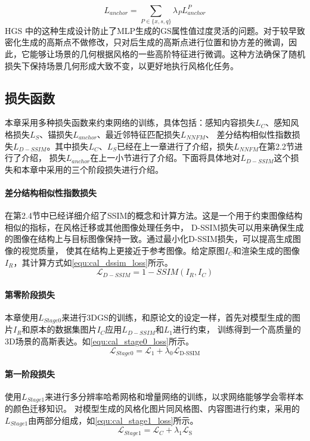 \begin{equation}
    \label{equ:cal_anchor_L}
    L_{anchor}=\sum_{P\in\{x,s,q\}}\lambda_PL_{anchor}^P
\end{equation}
HGS 中的这种生成设计防止了MLP生成的GS属性值过度灵活的问题。对于较早致密化生成的高斯点不做修改，只对后生成的高斯点进行位置和协方差的微调，因此，它能够让场景的几何根据风格的一些高阶特征进行微调。这种方法确保了随机损失下保持场景几何形成大致不变，以更好地执行风格化任务。
\subsection{损失函数}
本章采用多种损失函数来约束网络的训练，具体包括：感知内容损失$L_C$、感知风格损失$L_S$、锚损失$L_{anchor}$、最近邻特征匹配损失$L_{NNFM}$、
差分结构相似性指数损失$L_{D-SSIM}$。其中损失$L_C$、$L_S$已经在上一章进行了介绍，损失$L_{NNFM}$在第2.2节进行了介绍，
损失$L_{anchor}$在上一小节进行了介绍。下面将具体地对$L_{D-SSIM}$这个损失和本章中采用的三个阶段损失进行介绍。
\paragraph{差分结构相似性指数损失}
在第2.4节中已经详细介绍了SSIM的概念和计算方法。这是一个用于约束图像结构相似的指标，在风格迁移或其他图像处理任务中，
D-SSIM损失可以用来确保生成的图像在结构上与目标图像保持一致。通过最小化D-SSIM损失，可以提高生成图像的视觉质量，
使其在结构上更接近于参考图像。给定原图$I_C$和渲染生成的图像$I_R$，其计算方式如\autoref{equ:cal_dssim_loss}所示。
\begin{equation}
    \label{equ:cal_dssim_loss}
    \mathcal{L}_{D-SSIM}=1-SSIM(I_R,I_C)
\end{equation}
\paragraph{第零阶段损失}
本章使用$L_{Stage0}$来进行3DGS的训练，和原论文的设定一样，首先对模型生成的图片$I_R$和原本的数据集图片$I_C$应用$L_{D-SSIM}$和$L_1$进行约束，
训练得到一个高质量的3D场景的高斯表达。如\autoref{equ:cal_stage0_loss}所示。
\begin{equation}
    \label{equ:cal_stage0_loss}
    \mathcal{L}_{Stage0}=\mathcal{L}_1+\lambda_0\mathcal{L}_{\text{D-SSIM}}
\end{equation}
\paragraph{第一阶段损失}
使用$L_{Stage1}$来进行多分辨率哈希网格和增量网络的训练，以求网络能够学会零样本的颜色迁移知识。
对模型生成的风格化图片同风格图、内容图进行约束，采用的$L_{Stage1}$由两部分组成，如\autoref{equ:cal_stage1_loss}所示。
\begin{equation}
    \label{equ:cal_stage1_loss}
    \mathcal{L}_{Stage1}=\mathcal{L}_C+\lambda_1\mathcal{L}_\mathrm{S}
\end{equation}
